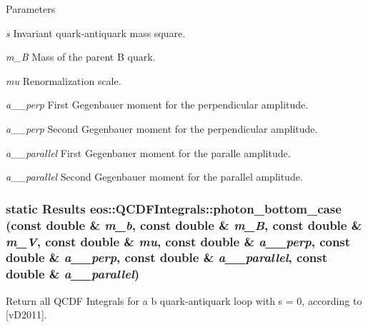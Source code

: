 \begin{DoxyParams}{Parameters}
\item[{\em s}]Invariant quark-\/antiquark mass square. \item[{\em m\_\-B}]Mass of the parent B quark. \item[{\em mu}]Renormalization scale. \item[{\em a\_\-1\_\-perp}]First Gegenbauer moment for the perpendicular amplitude. \item[{\em a\_\-2\_\-perp}]Second Gegenbauer moment for the perpendicular amplitude. \item[{\em a\_\-1\_\-parallel}]First Gegenbauer moment for the paralle amplitude. \item[{\em a\_\-2\_\-parallel}]Second Gegenbauer moment for the parallel amplitude. \end{DoxyParams}
\hypertarget{classeos_1_1QCDFIntegrals_af6508bca0f6425fcefc36a75699fd505}{
\subsubsection[{photon\_\-bottom\_\-case}]{\setlength{\rightskip}{0pt plus 5cm}static {\bf Results} eos::QCDFIntegrals::photon\_\-bottom\_\-case (const double \& {\em m\_\-b}, \/  const double \& {\em m\_\-B}, \/  const double \& {\em m\_\-V}, \/  const double \& {\em mu}, \/  const double \& {\em a\_\_\-perp}, \/  const double \& {\em a\_\_\-perp}, \/  const double \& {\em a\_\_\-parallel}, \/  const double \& {\em a\_\_\-parallel})}}
\label{classeos_1_1QCDFIntegrals_af6508bca0f6425fcefc36a75699fd505}
Return all QCDF Integrals for a b quark-\/antiquark loop with s = 0, according to \mbox{[}vD2011\mbox{]}.


